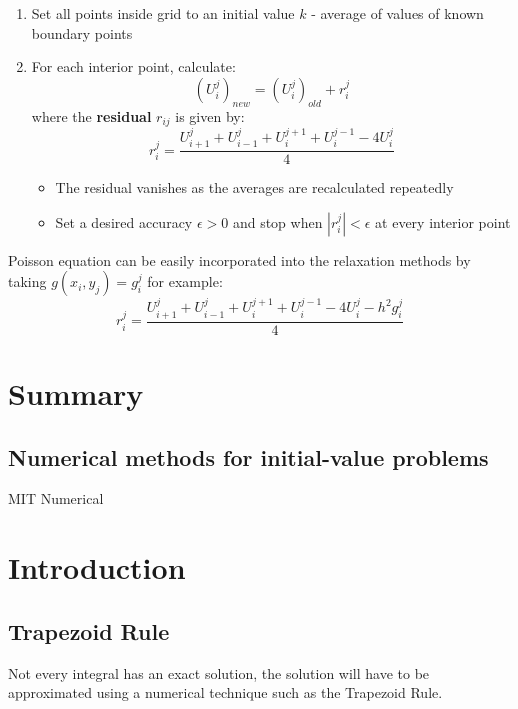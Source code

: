 \documentclass[10pt,a4paper]{article}
\begin{document}
\begin{enumerate}
    \item Set all points inside grid to an initial value $k$ - average of values of known boundary points
    \item For each interior point, calculate:
    $$
        \left(U_i^j\right)_{new} = \left(U_i^j\right)_{old} + r_i^j
    $$
    where the \textbf{residual} $r_{ij}$ is given by:
    $$
        r_i^j = \frac{U_{i+1}^j + U_{i-1}^j + U_i^{j+1} + U_i^{j-1} - 4U_i^j}{4}
    $$
    \begin{itemize}
        \item The residual vanishes as the averages are recalculated repeatedly
        \item Set a desired accuracy $\epsilon > 0$ and stop when $|r_i^j|<\epsilon$ at every
        interior point
    \end{itemize}
\end{enumerate}

Poisson equation can be easily incorporated into the relaxation methods by taking $g(x_i,y_j)=g_i^j$
for example:
$$
r_i^j = \frac{U_{i+1}^j + U_{i-1}^j + U_i^{j+1} + U_i^{j-1} - 4U_i^j - h^2g_i^j}{4}
$$

\section{Summary}
\subsection{Numerical methods for initial-value problems}

MIT Numerical

\section{Introduction}
\subsection{Trapezoid Rule}

Not every integral has an exact solution, the solution will have to be approximated using a
numerical technique such as the Trapezoid Rule. \par 
\end{document}

